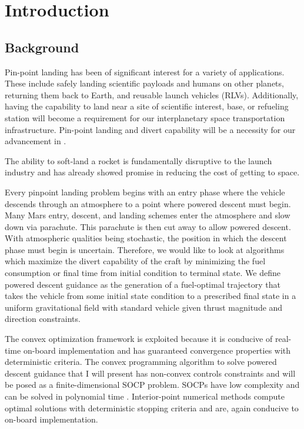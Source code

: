 \chapter{Introduction}
\label{introchap}

\section{Background}
Pin-point landing has been of significant interest for a variety of applications. These include safely landing scientific payloads and humans on other planets, returning them back to Earth, and reusable launch vehicles (RLVs). Additionally, having the capability to land near a site of scientific interest, base, or refueling station will become a requirement for our interplanetary space transportation infrastructure. Pin-point landing and divert capability will be a necessity for our advancement in .

The ability to soft-land a rocket is fundamentally disruptive to the launch industry and has already showed promise in reducing the cost of getting to space. 

Every pinpoint landing problem begins with an entry phase where the vehicle descends through an atmosphere to a point where powered descent must begin. Many Mars entry, descent, and landing schemes enter the atmosphere and slow down via parachute. This parachute is then cut away to allow powered descent. With atmospheric qualities being stochastic, the position in which the descent phase must begin is uncertain. Therefore, we would like to look at algorithms which maximize the divert capability of the craft by minimizing the fuel consumption or final time from initial condition to terminal state. We define powered descent guidance as the generation of a fuel-optimal trajectory that takes the vehicle from some initial state condition to a prescribed final state in a uniform gravitational field with standard vehicle given thrust magnitude and direction constraints.

The convex optimization framework is exploited because it is conducive of real-time on-board implementation and has guaranteed convergence properties with deterministic criteria. The convex programming algorithm to solve powered descent guidance that I will present has non-convex controls constraints and will be posed as a finite-dimensional SOCP problem. SOCPs have low complexity and can be solved in polynomial time \cite{boyd2004convex}. Interior-point numerical methods compute optimal solutions with deterministic stopping criteria and are, again conducive to on-board implementation. 

